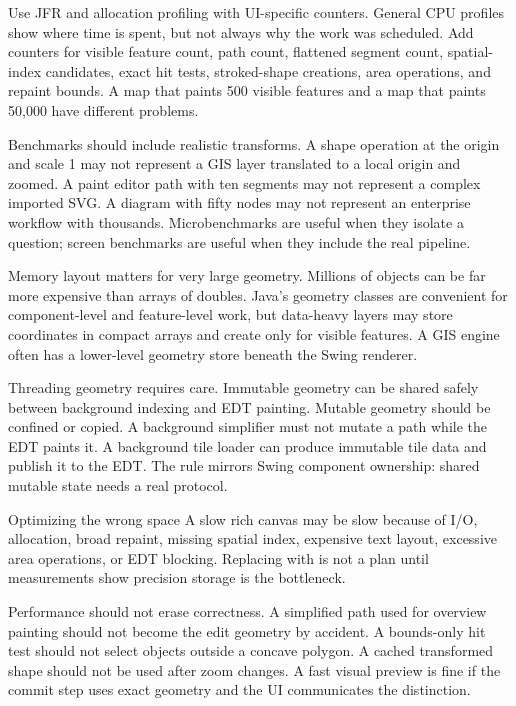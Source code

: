 Use JFR and allocation profiling with UI-specific counters. General CPU profiles show where time is spent, but not always why the work was scheduled. Add counters for visible feature count, path count, flattened segment count, spatial-index candidates, exact hit tests, stroked-shape creations, area operations, and repaint bounds. A map that paints 500 visible features and a map that paints 50,000 have different problems.

Benchmarks should include realistic transforms. A shape operation at the origin and scale 1 may not represent a GIS layer translated to a local origin and zoomed. A paint editor path with ten segments may not represent a complex imported SVG. A diagram with fifty nodes may not represent an enterprise workflow with thousands. Microbenchmarks are useful when they isolate a question; screen benchmarks are useful when they include the real pipeline.

Memory layout matters for very large geometry. Millions of  objects can be far more expensive than arrays of doubles. Java's geometry classes are convenient for component-level and feature-level work, but data-heavy layers may store coordinates in compact arrays and create  only for visible features. A GIS engine often has a lower-level geometry store beneath the Swing renderer.

Threading geometry requires care. Immutable geometry can be shared safely between background indexing and EDT painting. Mutable geometry should be confined or copied. A background simplifier must not mutate a path while the EDT paints it. A background tile loader can produce immutable tile data and publish it to the EDT. The rule mirrors Swing component ownership: shared mutable state needs a real protocol.

\begin{pitfallbox}{Optimizing the wrong space}
A slow rich canvas may be slow because of I/O, allocation, broad repaint, missing spatial index, expensive text layout, excessive area operations, or EDT blocking. Replacing  with  is not a plan until measurements show precision storage is the bottleneck.
\end{pitfallbox}

Performance should not erase correctness. A simplified path used for overview painting should not become the edit geometry by accident. A bounds-only hit test should not select objects outside a concave polygon. A cached transformed shape should not be used after zoom changes. A fast visual preview is fine if the commit step uses exact geometry and the UI communicates the distinction.

